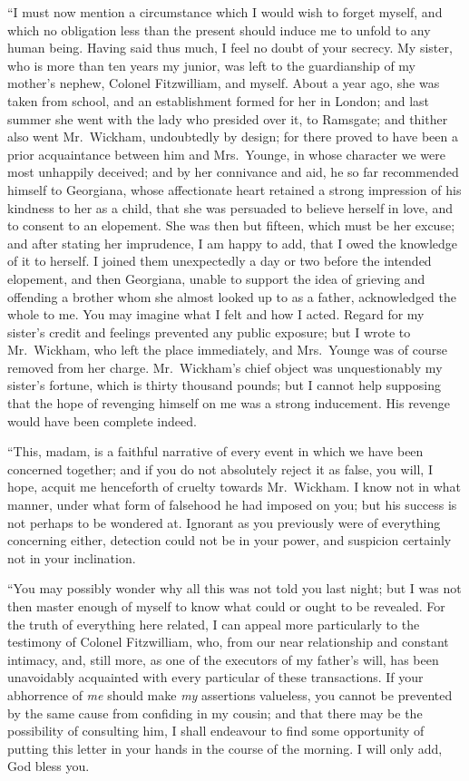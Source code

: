 ``I must now mention a circumstance which I would wish to
forget myself, and which no obligation less than the present
should induce me to unfold to any human being.  Having said
thus much, I feel no doubt of your secrecy.  My sister, who is
more than ten years my junior, was left to the guardianship of
my mother's nephew, Colonel Fitzwilliam, and myself.  About a
year ago, she was taken from school, and an establishment
formed for her in London; and last summer she went with the
lady who presided over it, to Ramsgate; and thither also went
Mr.\ Wickham, undoubtedly by design; for there proved to have
been a prior acquaintance between him and Mrs.\ Younge, in
whose character we were most unhappily deceived; and by
her connivance and aid, he so far recommended himself to
Georgiana, whose affectionate heart retained a strong impression
of his kindness to her as a child, that she was persuaded to
believe herself in love, and to consent to an elopement.  She was
then but fifteen, which must be her excuse; and after stating her
imprudence, I am happy to add, that I owed the knowledge of it
to herself.  I joined them unexpectedly a day or two before the
intended elopement, and then Georgiana, unable to support the
idea of grieving and offending a brother whom she almost
looked up to as a father, acknowledged the whole to me.  You
may imagine what I felt and how I acted.  Regard for my sister's
credit and feelings prevented any public exposure; but I wrote
to Mr.\ Wickham, who left the place immediately, and Mrs.\ Younge
was of course removed from her charge.  Mr.\ Wickham's chief
object was unquestionably my sister's fortune, which is thirty
thousand pounds; but I cannot help supposing that the hope of
revenging himself on me was a strong inducement.  His revenge
would have been complete indeed.

``This, madam, is a faithful narrative of every event in which
we have been concerned together; and if you do not absolutely
reject it as false, you will, I hope, acquit me henceforth
of cruelty towards Mr.\ Wickham.  I know not in what manner,
under what form of falsehood he had imposed on you; but his
success is not perhaps to be wondered at.  Ignorant as you
previously were of everything concerning either, detection
could not be in your power, and suspicion certainly not in
your inclination.

``You may possibly wonder why all this was not told you last
night; but I was not then master enough of myself to know what
could or ought to be revealed.  For the truth of everything here
related, I can appeal more particularly to the testimony of
Colonel Fitzwilliam, who, from our near relationship and
constant intimacy, and, still more, as one of the executors of
my father's will, has been unavoidably acquainted with every
particular of these transactions.  If your abhorrence of \emph{me}
should make \emph{my} assertions valueless, you cannot be prevented
by the same cause from confiding in my cousin; and that there
may be the possibility of consulting him, I shall endeavour to
find some opportunity of putting this letter in your hands in
the course of the morning.  I will only add, God bless you.

